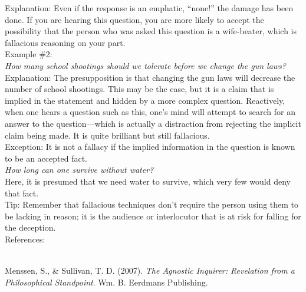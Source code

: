 \documentclass[a4paper,12pt,single,pdftex]{scrartcl}
\begin{document}
    
      Explanation: Even if the response is an emphatic, “none!” the damage has been done.  If you are hearing this question, you are more likely to accept the possibility that the person who was asked this question is a wife-beater, which is fallacious reasoning on your part.
    \\

    
      Example \#2:
    \\

    
      {\em How many school shootings should we tolerate before we change the gun laws?}
    \\

    
      Explanation: The presupposition is that changing the gun laws will decrease the number of school shootings.  This may be the case, but it is a claim that is implied in the statement and hidden by a more complex question.  Reactively, when one hears a question such as this, one's mind will attempt to search for an answer to the question—which is actually a distraction from rejecting the implicit claim being made.  It is quite brilliant but still fallacious.
    \\

    
      Exception: It is not a fallacy if the implied information in the question is known to be an accepted fact.
    \\

    
      {\em How long can one survive without water?}
    \\

    
      Here, it is presumed that we need water to survive, which very few would deny that fact.
    \\

    
      Tip: Remember that fallacious techniques don’t require the person using them to be lacking in reason; it is the audience or interlocutor that is at risk for falling for the deception.
    \\

    References:

    
      
        
      \\

      
        
          Menssen, S., \& Sullivan, T. D. (2007). {\it The Agnostic Inquirer: Revelation from a Philosophical Standpoint}. Wm. B. Eerdmans Publishing.
        
      
    
\end{document}
